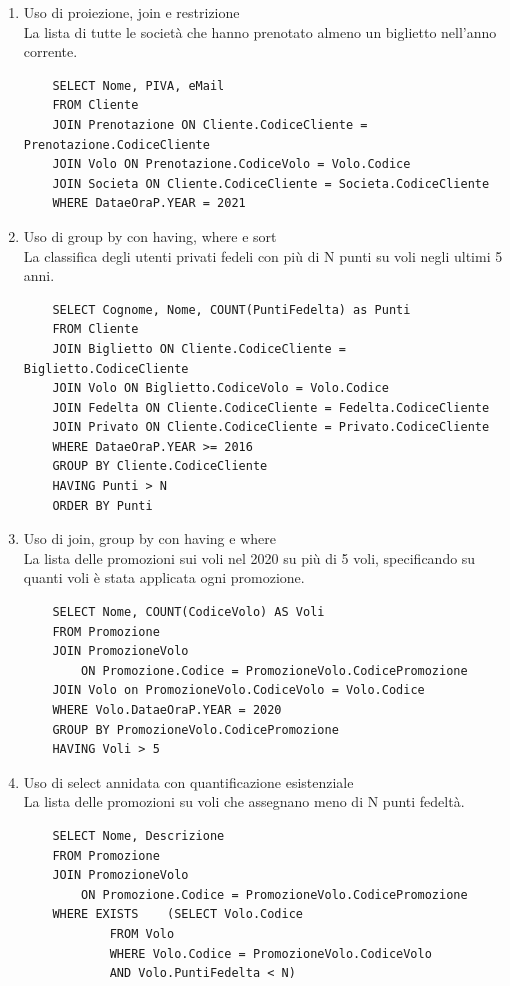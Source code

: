 \documentclass[10pt]{article}
\begin{document}
\begin{enumerate}
	\item Uso di proiezione, join e restrizione\\
	La lista di tutte le società che hanno prenotato almeno un biglietto nell'anno corrente.
	\begin{lstlisting}
	SELECT Nome, PIVA, eMail
	FROM Cliente
	JOIN Prenotazione ON Cliente.CodiceCliente = Prenotazione.CodiceCliente
	JOIN Volo ON Prenotazione.CodiceVolo = Volo.Codice
	JOIN Societa ON Cliente.CodiceCliente = Societa.CodiceCliente
	WHERE DataeOraP.YEAR = 2021
	\end{lstlisting}
	\item Uso di group by con having, where e sort\\
	La classifica degli utenti privati fedeli con più di N punti su voli negli ultimi 5 anni.
	\begin{lstlisting}
	SELECT Cognome, Nome, COUNT(PuntiFedelta) as Punti
	FROM Cliente
	JOIN Biglietto ON Cliente.CodiceCliente = Biglietto.CodiceCliente
	JOIN Volo ON Biglietto.CodiceVolo = Volo.Codice
	JOIN Fedelta ON Cliente.CodiceCliente = Fedelta.CodiceCliente
	JOIN Privato ON Cliente.CodiceCliente = Privato.CodiceCliente
	WHERE DataeOraP.YEAR >= 2016
	GROUP BY Cliente.CodiceCliente
	HAVING Punti > N
	ORDER BY Punti
	\end{lstlisting}
	\item Uso di join, group by con having e where\\
	La lista delle promozioni sui voli nel 2020 su più di 5 voli, specificando su quanti voli è stata applicata ogni promozione.
	\begin{lstlisting}
	SELECT Nome, COUNT(CodiceVolo) AS Voli
	FROM Promozione
	JOIN PromozioneVolo
		ON Promozione.Codice = PromozioneVolo.CodicePromozione
	JOIN Volo on PromozioneVolo.CodiceVolo = Volo.Codice
	WHERE Volo.DataeOraP.YEAR = 2020
	GROUP BY PromozioneVolo.CodicePromozione
	HAVING Voli > 5
	\end{lstlisting}
	\item Uso di select annidata con quantificazione esistenziale\\La lista delle promozioni su voli che assegnano meno di N punti fedeltà.
	\begin{lstlisting}
	SELECT Nome, Descrizione
	FROM Promozione
	JOIN PromozioneVolo
		ON Promozione.Codice = PromozioneVolo.CodicePromozione
	WHERE EXISTS	(SELECT Volo.Codice
			FROM Volo
			WHERE Volo.Codice = PromozioneVolo.CodiceVolo
			AND Volo.PuntiFedelta < N)
	\end{lstlisting}
	

\end{enumerate}
\end{document}

